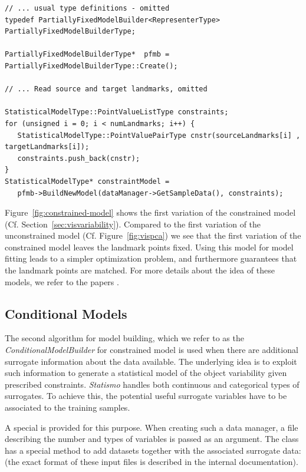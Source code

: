 \documentclass{InsightArticle}
\newcommand{\Statismo}{\emph{Statismo}\xspace}
\begin{document}
\begin{verbatim}
// ... usual type definitions - omitted
typedef PartiallyFixedModelBuilder<RepresenterType> PartiallyFixedModelBuilderType;

PartiallyFixedModelBuilderType*  pfmb = PartiallyFixedModelBuilderType::Create();

// ... Read source and target landmarks, omitted

StatisticalModelType::PointValueListType constraints;
for (unsigned i = 0; i < numLandmarks; i++) { 
   StatisticalModelType::PointValuePairType cnstr(sourceLandmarks[i] , targetLandmarks[i]);
   constraints.push_back(cnstr);
}
StatisticalModelType* constraintModel = 
   pfmb->BuildNewModel(dataManager->GetSampleData(), constraints);
\end{verbatim}
Figure~\ref{fig:constrained-model} shows the first variation of the constrained model (Cf. Section~\ref{sec:visvariability}). Compared to the first variation of the unconstrained model (Cf. Figure~\ref{fig:vispca}) we see that the first variation of the constrained model leaves the landmark points fixed.  Using this model for model fitting leads to a simpler optimization problem, and furthermore guarantees that the landmark points are matched. 
For more details about the idea of these models, we refer to the papers \cite{luthi_probabilistic_2009,luthi_using_2011}.

\subsection{Conditional Models}
The second algorithm for model building, which we refer to as the
\emph{ConditionalModelBuilder} for constrained model is used when
there are additional surrogate information about the data available.
The underlying idea is to exploit such information to generate a
statistical model of the object variability given prescribed
constraints. \Statismo handles both continuous and categorical types
of surrogates.  To achieve this, the potential useful surrogate
variables have to be associated to the training samples.

A special  is provided for this
purpose. When creating such a data manager, a file describing the
number and types of variables is passed as an argument.  The class has
a special method to add datasets together with the associated
surrogate data: 
(the exact format of these input files is described in the internal documentation).
\end{document}
